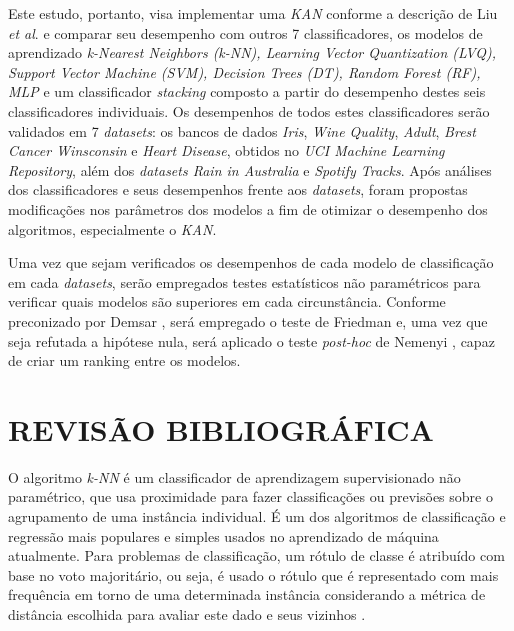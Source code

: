 \documentclass[journal]{IEEEtran}
\begin{document}
Este estudo, portanto, visa implementar uma \textit{KAN} conforme a descrição de Liu \textit{et al}. \cite{liu} e comparar seu desempenho com outros 7 classificadores, os modelos de aprendizado \textit{k-Nearest Neighbors (k-NN), Learning Vector Quantization (LVQ), Support Vector Machine (SVM), Decision Trees (DT), Random Forest (RF), MLP} e um classificador \textit{stacking} composto a partir do desempenho destes seis classificadores individuais. Os desempenhos de todos estes classificadores serão validados em 7 \textit{datasets}: os bancos de dados \textit{Iris},\textit{ Wine Quality}, \textit{Adult}, \textit{Brest Cancer Winsconsin} e \textit{Heart Disease}, obtidos no \textit{UCI Machine Learning Repository}, além dos \textit{datasets Rain in Australia} e \textit{Spotify Tracks}. Após análises dos classificadores e seus desempenhos frente aos \textit{datasets}, foram propostas modificações nos parâmetros dos modelos a fim de otimizar o desempenho dos algoritmos, especialmente o \textit{KAN}.

Uma vez que sejam verificados os desempenhos de cada modelo de classificação em cada \textit{datasets}, serão empregados testes estatísticos não paramétricos para verificar quais modelos são superiores em cada circunstância. Conforme preconizado por Demsar \cite{demsar}, será empregado o teste de Friedman \cite{friedman} e, uma vez que seja refutada a hipótese nula, será aplicado o teste \textit{post-hoc} de Nemenyi \cite{nemenyi}, capaz de criar um ranking entre os modelos.



% 
% 
% 
% 
\section{REVISÃO BIBLIOGRÁFICA}

O algoritmo \textit{k-NN} é um classificador de aprendizagem supervisionado não paramétrico, que usa proximidade para fazer classificações ou previsões sobre o agrupamento de uma instância individual. É um dos algoritmos de classificação e regressão mais populares e simples usados no aprendizado de máquina atualmente. Para problemas de classificação, um rótulo de classe é atribuído com base no voto majoritário, ou seja, é usado o rótulo que é representado com mais frequência em torno de uma determinada instância considerando a métrica de distância escolhida para avaliar este dado e seus vizinhos \cite{ibm2024b}.
\end{document}
